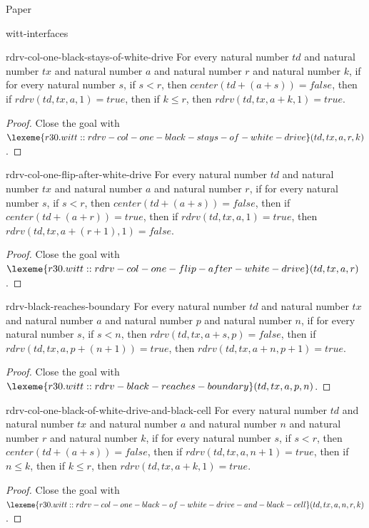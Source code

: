 \begin{lexlean}{Paper}
\begin{section}{witt-interfaces}
  \begin{theorem}{rdrv-col-one-black-stays-of-white-drive}
  For every natural number \(td\) and natural number \(tx\) and natural number \(a\) and natural number \(r\) and natural number \(k\), if for every natural number \(s\), if \(s < r\), then \(center(td + (a + s)) = false\), then if \(rdrv(td, tx, a, 1) = true\), then if \(k ≤ r\), then \(rdrv(td, tx, a + k, 1) = true\).
  \begin{proof}
  Close the goal with \(\lexeme{r30.witt::rdrv-col-one-black-stays-of-white-drive}(td, tx, a, r, k)\).
  \end{proof}
  \end{theorem}

  \begin{theorem}{rdrv-col-one-flip-after-white-drive}
  For every natural number \(td\) and natural number \(tx\) and natural number \(a\) and natural number \(r\), if for every natural number \(s\), if \(s < r\), then \(center(td + (a + s)) = false\), then if \(center(td + (a + r)) = true\), then if \(rdrv(td, tx, a, 1) = true\), then \(rdrv(td, tx, a + (r + 1), 1) = false\).
  \begin{proof}
  Close the goal with \(\lexeme{r30.witt::rdrv-col-one-flip-after-white-drive}(td, tx, a, r)\).
  \end{proof}
  \end{theorem}

  \begin{theorem}{rdrv-black-reaches-boundary}
  For every natural number \(td\) and natural number \(tx\) and natural number \(a\) and natural number \(p\) and natural number \(n\), if for every natural number \(s\), if \(s < n\), then \(rdrv(td, tx, a + s, p) = false\), then if \(rdrv(td, tx, a, p + (n + 1)) = true\), then \(rdrv(td, tx, a + n, p + 1) = true\).
  \begin{proof}
  Close the goal with \(\lexeme{r30.witt::rdrv-black-reaches-boundary}(td, tx, a, p, n)\).
  \end{proof}
  \end{theorem}

  \begin{theorem}{rdrv-col-one-black-of-white-drive-and-black-cell}
  For every natural number \(td\) and natural number \(tx\) and natural number \(a\) and natural number \(n\) and natural number \(r\) and natural number \(k\), if for every natural number \(s\), if \(s < r\), then \(center(td + (a + s)) = false\), then if \(rdrv(td, tx, a, n + 1) = true\), then if \(n ≤ k\), then if \(k ≤ r\), then \(rdrv(td, tx, a + k, 1) = true\).
  \begin{proof}
  Close the goal with \(\lexeme{r30.witt::rdrv-col-one-black-of-white-drive-and-black-cell}(td, tx, a, n, r, k)\).
  \end{proof}
  \end{theorem}


\end{section}
\end{lexlean}
